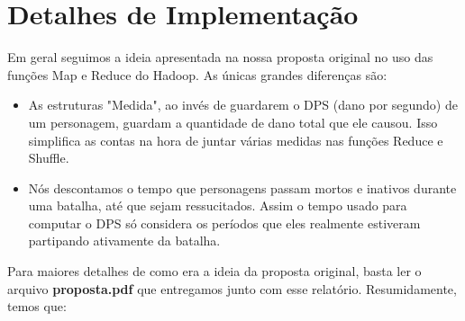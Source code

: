 \documentclass[a4paper,11pt]{article}
\begin{document}
\section{Detalhes de Implementação}

  Em geral seguimos a ideia apresentada na nossa proposta original no uso das
  funções Map e Reduce do Hadoop. As únicas grandes diferenças são:
  
  \begin{itemize}
    \item
      As estruturas "Medida", ao invés de guardarem o DPS (dano por segundo) de
      um personagem, guardam a quantidade de dano total que ele causou. Isso
      simplifica as contas na hora de juntar várias medidas nas funções Reduce e
      Shuffle.
    \item
      Nós descontamos o tempo que personagens passam mortos e inativos durante
      uma batalha, até que sejam ressucitados. Assim o tempo usado para computar
      o DPS só considera os períodos que eles realmente estiveram partipando
      ativamente da batalha.
  \end{itemize}    
  
  Para maiores detalhes de como era a ideia da proposta original, basta ler o
  arquivo \textbf{proposta.pdf} que entregamos junto com esse relatório.
  Resumidamente, temos que:
  
\end{document}
